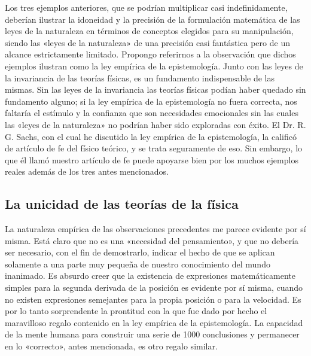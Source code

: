 \documentclass[a4paper, 12pt]{article}
\begin{document}
Los tres ejemplos anteriores, que se podrían multiplicar casi indefinidamente, deberían ilustrar la idoneidad y la precisión de la formulación matemática de las leyes de la naturaleza en términos de conceptos elegidos para su manipulación, siendo las «leyes de la naturaleza» de una precisión casi fantástica pero de un alcance estrictamente limitado. Propongo referirnos a la observación que dichos ejemplos ilustran como la ley empírica de la epistemología. Junto con las leyes de la invariancia de las teorías físicas, es un fundamento indispensable de las mismas. Sin las leyes de la invariancia las teorías físicas podían haber quedado sin fundamento alguno; si la ley empírica de la epistemología no fuera correcta, nos faltaría el estímulo y la confianza que son necesidades emocionales sin las cuales las «leyes de la naturaleza» no podrían haber sido exploradas con éxito. El  Dr. R. G. Sachs, con el cual he discutido la ley empírica de la epistemología, la calificó de artículo de fe del físico teórico, y se trata seguramente de eso. Sin embargo, lo que él llamó nuestro artículo de fe puede apoyarse bien por los muchos ejemplos reales además de los tres antes mencionados.

\subsection*{La unicidad de las teorías de la física}

La naturaleza empírica de las observaciones precedentes me parece evidente por sí misma. Está claro que no es una «necesidad del pensamiento», y que no debería ser necesario, con el fin de demostrarlo, indicar el hecho de que se aplican solamente a una parte muy pequeña de nuestro conocimiento del mundo inanimado. Es absurdo creer que la existencia de expresiones matemáticamente simples para la segunda derivada de la posición es evidente por sí misma, cuando no existen expresiones semejantes para la propia posición o para la velocidad. Es por lo tanto sorprendente la prontitud con la que fue dado por hecho el maravilloso regalo contenido en la ley empírica de la epistemología. La capacidad de la mente humana para construir una serie de 1000 conclusiones y permanecer en lo «correcto», antes mencionada, es otro regalo similar.
\end{document}
